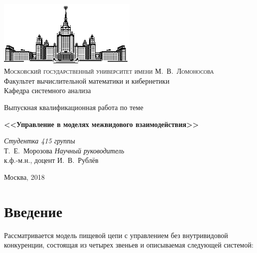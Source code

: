 \documentclass[11pt]{article}
\begin{document}
\thispagestyle{empty}

\begin{center}
\ \vspace{-3cm}

\includegraphics[width=0.5\textwidth]{msu.eps}\\
{\scshape Московский государственный университет имени М.~В.~Ломоносова}\\
Факультет вычислительной математики и кибернетики\\
Кафедра системного анализа

\vfill

{\LARGE Выпускная квалификационная работа по теме}

\vspace{1cm}

{\Huge\bfseries <<Управление в моделях межвидового взаимодействия>>}
\end{center}

\vspace{1cm}

\begin{flushright}
  \large
  \textit{Студентка 415 группы}\\
  Т.~Е.~Морозова
  \textit{Научный руководитель}\\
  к.ф.-м.н., доцент И.~В.~Рублёв 

  \vspace{5mm}

 \end{flushright}

\vfill

\begin{center}
Москва, 2018
\end{center}

\newpage
\tableofcontents
\newpage

\section{Введение}

Рассматривается модель пищевой цепи с управлением без внутривидовой конкуренции, состоящая из четырех звеньев и описываемая следующей системой:
\end{document}
